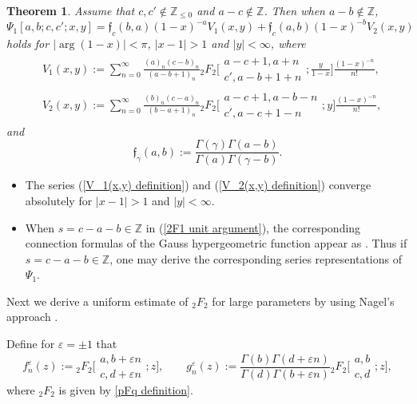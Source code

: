 \documentclass[10pt,a4paper]{amsart}
\numberwithin{equation}{section}
\newtheorem{Theorem}{Theorem}[section]
\newcommand{\ZZ}{\ensuremath{\mathbb{Z}}}
\begin{document}
\begin{Theorem}%
	Assume that $c,c'\notin\ZZ_{\leqslant 0}$ and $a-c\notin\ZZ$. Then when $a-b\notin\ZZ$,
	\begin{equation}\label{Psi_1 large arguments}
		\Psi_1[a,b;c,c';x,y]=\mathfrak{f}_c(b,a)(1-x)^{-a}V_1(x,y)+\mathfrak{f}_c(a,b)(1-x)^{-b}V_2(x,y)
	\end{equation}
	holds for $|{\arg}(1-x)|<\pi$, $|x-1|>1$ and $|y|<\infty$, where
	\begin{align}
		&V_1(x,y):=\sum_{n=0}^{\infty}\frac{(a)_n (c-b )_n}{ (a-b+1 )_n}
		{}_2F_2\biggl[\begin{matrix}
			a-c+1,a+n \\
			c',a-b+1+n
		\end{matrix};\frac{y}{1-x}\biggr]\frac{(1-x)^{-n}}{n!},\label{V_1(x,y) definition}\\
		&V_2(x,y):=\sum_{n=0}^{\infty}\frac{(b)_n (c-a )_n}{ (b-a+1 )_n}
		{}_2F_2\biggl[\begin{matrix}
			a-c+1,a-b-n\\
			c',a-c+1-n
		\end{matrix};y\biggr]\frac{(1-x)^{-n}}{n!},\label{V_2(x,y) definition}
	\end{align}
	and
	\[\mathfrak{f}_\gamma(a,b):=\frac{\Gamma(\gamma)\Gamma(a-b)}{\Gamma(a)\Gamma(\gamma-b)}.\]
\end{Theorem}

\begin{Remark}\quad
	\begin{itemize}\itemsep=0pt
		\item[(1)] The series (\ref{V_1(x,y) definition}) and (\ref{V_2(x,y) definition}) converge absolutely for $|x-1|>1$ and $|y|<\infty$.
		\item[(2)] When $s=c-a-b\in\ZZ$ in (\ref{2F1 unit argument}), the corresponding connection formulas of the Gauss hypergeometric function appear as \cite[equations~(15.3.10)--(15.3.12)]{Handbook-of-math-functions}. Thus if ${s=c-a-b\in\ZZ}$, one may derive the corresponding series representations of $\Psi_1$.
	\end{itemize}
\end{Remark}

Next we derive a uniform estimate of $_2F_2$ for large parameters by using Nagel's approach \mbox{\cite[equations~(A16)--(A19)]{Nagel-2004}}.

Define for $\varepsilon=\pm 1$ that
\begin{equation}\label{f_n(z) g_n(z) definition}
	f_n^{\varepsilon}(z):={}_2F_2\biggl[\begin{matrix}
		a,b+\varepsilon n\\
		c,d+\varepsilon n
	\end{matrix};z\biggr],\qquad g_n^{\varepsilon}(z):=\frac{\Gamma(b)\Gamma(d+\varepsilon n)}{\Gamma(d)\Gamma(b+\varepsilon n)}{}_2F_2\biggl[\begin{matrix}
		a,b\\
		c,d
	\end{matrix};z\biggr],
\end{equation}
where $_2F_{2}$ is given by \eqref{pFq definition}.
\end{document}
